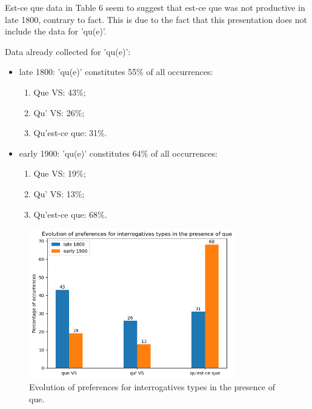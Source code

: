 \documentclass[fleqn,10pt]{wlscirep}
\begin{document}
  \noindent Est-ce que data in Table 6 seem to suggest that est-ce que was not productive in late 1800, contrary to fact.
  \noindent This is due to the fact that this presentation does not include the data for 'qu(e)'.

  Data already collected for 'qu(e)':
  \begin{itemize}
    \item late 1800: 'qu(e)' constitutes 55\% of all occurrences:
        \begin{enumerate}
            \item \vspace*{-2mm} Que VS: 43\%;
            \item \vspace*{-2mm} Qu' VS: 26\%;
            \item \vspace*{-2mm} Qu'est-ce que: 31\%.
        \end{enumerate}
    \item early 1900: 'qu(e)' constitutes 64\% of all occurrences:
        \begin{enumerate}
            \item \vspace*{-2mm} Que VS: 19\%;
            \item \vspace*{-2mm} Qu' VS: 13\%;
            \item \vspace*{-2mm} Qu'est-ce que: 68\%.
        \end{enumerate}
  \end{itemize}

  \begin{figure}[H]
    \centering
    \includegraphics[width=90mm]{images/que.png} %
    \caption{Evolution of preferences for interrogatives types in the presence of que.}
    \label{fig:boat5}
  \end{figure}
\end{document}
